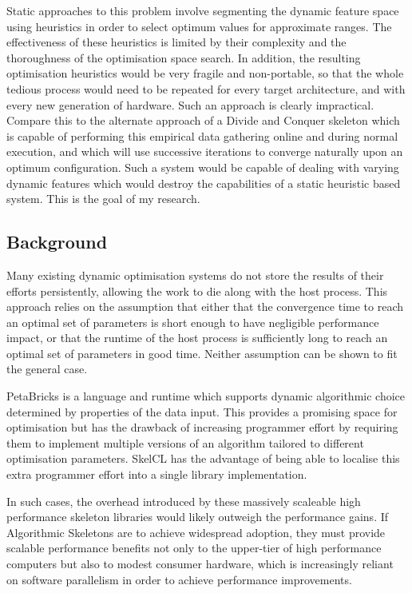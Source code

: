 Static approaches to this problem involve segmenting the dynamic
feature space using heuristics in order to select optimum values for
approximate ranges. The effectiveness of these heuristics is limited
by their complexity and the thoroughness of the optimisation space
search. In addition, the resulting optimisation heuristics would be
very fragile and non-portable, so that the whole tedious process would
need to be repeated for every target architecture, and with every new
generation of hardware. Such an approach is clearly
impractical. Compare this to the alternate approach of a Divide and
Conquer skeleton which is capable of performing this empirical data
gathering online and during normal execution, and which will use
successive iterations to converge naturally upon an optimum
configuration. Such a system would be capable of dealing with varying
dynamic features which would destroy the capabilities of a static
heuristic based system. This is the goal of my research.

\subsection{Background}
Many existing dynamic optimisation systems do not store the results of
their efforts persistently, allowing the work to die along with the
host process. This approach relies on the assumption that either that
the convergence time to reach an optimal set of parameters is short
enough to have negligible performance impact, or that the runtime of
the host process is sufficiently long to reach an optimal set of
parameters in good time. Neither assumption can be shown to fit the
general case.

PetaBricks is a language and runtime which supports dynamic
algorithmic choice determined by properties of the data input. This
provides a promising space for optimisation but has the drawback of
increasing programmer effort by requiring them to implement multiple
versions of an algorithm tailored to different optimisation
parameters. SkelCL has the advantage of being able to localise this
extra programmer effort into a single library implementation.

In such cases, the overhead introduced by these massively scaleable
high performance skeleton libraries would likely outweigh the
performance gains. If Algorithmic Skeletons are to achieve widespread
adoption, they must provide scalable performance benefits not only to
the upper-tier of high performance computers but also to modest
consumer hardware, which is increasingly reliant on software
parallelism in order to achieve performance improvements.

